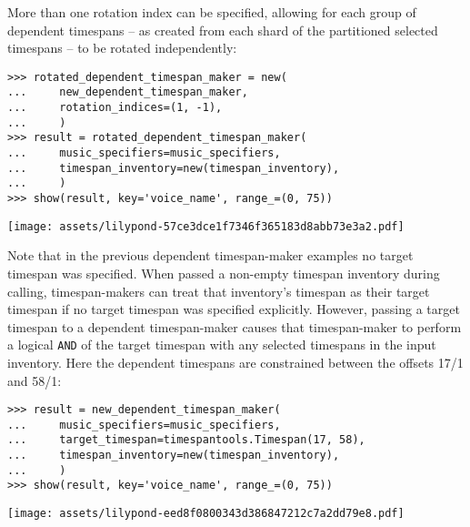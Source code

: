 \noindent More than one rotation index can be specified, allowing for each
group of dependent timespans -- as created from each shard of the partitioned
selected timespans -- to be rotated independently:

\begin{comment}
<abjad>
rotated_dependent_timespan_maker = new(
    new_dependent_timespan_maker,
    rotation_indices=(1, -1),
    )
result = rotated_dependent_timespan_maker(
    music_specifiers=music_specifiers,
    timespan_inventory=new(timespan_inventory),
    )
show(result, key='voice_name', range_=(0, 75))
</abjad>
\end{comment}

\begin{singlespacing}
\vspace{-0.5\baselineskip}
\begin{lstlisting}
>>> rotated_dependent_timespan_maker = new(
...     new_dependent_timespan_maker,
...     rotation_indices=(1, -1),
...     )
>>> result = rotated_dependent_timespan_maker(
...     music_specifiers=music_specifiers,
...     timespan_inventory=new(timespan_inventory),
...     )
>>> show(result, key='voice_name', range_=(0, 75))
\end{lstlisting}
\noindent\texttt{[image: assets/lilypond-57ce3dce1f7346f365183d8abb73e3a2.pdf]}
\end{singlespacing}

\noindent Note that in the previous dependent timespan-maker examples no target
timespan was specified. When passed a non-empty timespan inventory during
calling, timespan-makers can treat that inventory's timespan as their target
timespan if no target timespan was specified explicitly. However, passing a
target timespan to a dependent timespan-maker causes that timespan-maker to
perform a logical \texttt{AND} of the target timespan with any selected
timespans in the input inventory. Here the dependent timespans are constrained
between the offsets 17/1 and 58/1:

\begin{comment}
<abjad>
result = new_dependent_timespan_maker(
    music_specifiers=music_specifiers,
    target_timespan=timespantools.Timespan(17, 58),
    timespan_inventory=new(timespan_inventory),
    )
show(result, key='voice_name', range_=(0, 75))
</abjad>
\end{comment}

\begin{singlespacing}
\vspace{-0.5\baselineskip}
\begin{lstlisting}
>>> result = new_dependent_timespan_maker(
...     music_specifiers=music_specifiers,
...     target_timespan=timespantools.Timespan(17, 58),
...     timespan_inventory=new(timespan_inventory),
...     )
>>> show(result, key='voice_name', range_=(0, 75))
\end{lstlisting}
\noindent\texttt{[image: assets/lilypond-eed8f0800343d386847212c7a2dd79e8.pdf]}
\end{singlespacing}

